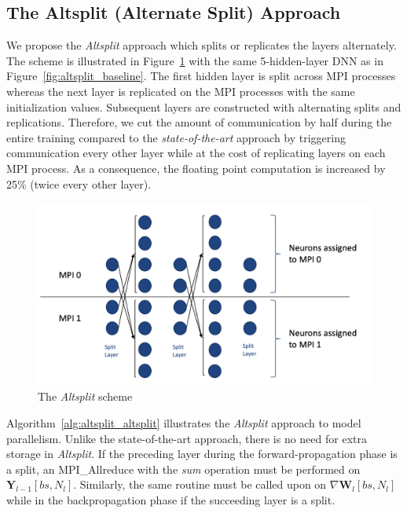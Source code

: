 \subsection{The Altsplit (Alternate Split) Approach}
We propose the \emph{Altsplit} approach which splits or replicates the layers 
alternately. The scheme is illustrated in Figure~\ref{fig:altsplit_scheme} with 
the same 5-hidden-layer DNN as in Figure~\ref{fig:altsplit_baseline}. The first 
hidden layer is split across MPI processes whereas the next layer is replicated 
on the MPI processes with the same initialization values. Subsequent layers are 
constructed with alternating splits and replications. Therefore, we cut the 
amount of communication by half during the entire training compared to the 
\emph{state-of-the-art} approach by triggering communication every other layer while at 
the cost of replicating layers on each MPI process. As a consequence, the floating
point computation is increased by 25\% (twice every other layer).
\begin{figure}[H]
    \centerline{\includegraphics[scale=0.60]{altsplit/figs/altsplit.png}}
    \caption{The \emph{Altsplit} scheme}
    \label{fig:altsplit_scheme}
\end{figure}

Algorithm~\ref{alg:altsplit_altsplit} illustrates the \emph{Altsplit} approach 
to model parallelism. Unlike the state-of-the-art approach, there is no need for extra 
storage in \emph{Altsplit}. If the preceding layer during the 
forward-propagation phase is a split, an MPI\_Allreduce with the \textit{sum} 
operation must be performed on $\pmb{Y}_{l-1}[bs, N_{l}]$. Similarly, the same 
routine must be called upon on $\nabla \pmb{W}_l[bs, N_l]$ while in the 
backpropagation phase if the succeeding layer is a split.

